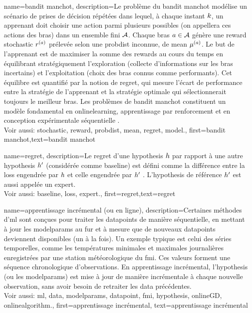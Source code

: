 {
	name={bandit manchot},
	description={Le problème du bandit manchot modélise un scénario 
		de prises de décision répétées dans lequel, à chaque instant $k$, un apprenant doit 
		choisir une action parmi plusieurs possibles (on appellera ces actions des bras) dans un ensemble fini $\mathcal{A}$. 
		Chaque bras $a \in \mathcal{A}$ génère une \gls{reward} \gls{stochastic} $r^{(a)}$ 
		prélevée selon une \gls{probdist} inconnue, de \gls{mean} $\mu^{(a)}$. 
		Le but de l’apprenant est de maximiser la somme des \glspl{reward} au cours du temps en équilibrant 
		stratégiquement l’exploration (collecte d’informations sur les bras incertains) et 
		l’exploitation (choix des bras connus comme performants). 
		Cet équilibre est quantifié par la notion de \gls{regret}, qui mesure l’écart de performance 
		entre la stratégie de l’apprenant et la stratégie optimale qui sélectionnerait toujours le meilleur bras. 
		Les problèmes de bandit manchot constituent un modèle fondamental en \gls{onlinelearning}, 
		apprentissage par renforcement et en conception expérimentale séquentielle \cite{Bubeck2012}.
		\\ 
		Voir aussi: \gls{stochastic}, \gls{reward}, \gls{probdist}, \gls{mean}, \gls{regret}, \gls{model}.},
	first={bandit manchot},text={bandit manchot}
}

{	name={regret},
	description={Le regret d’une \gls{hypothesis} $h$ par rapport à 
		une autre \gls{hypothesis} $h'$ (considérée comme \gls{baseline}) 
		est défini comme la différence entre la \gls{loss} engendrée par $h$ 
		et celle engendrée par $h'$ \cite{PredictionLearningGames}. 
		L'\gls{hypothesis} de référence $h'$ est aussi appelée un \gls{expert}.
		\\ 
		Voir aussi: \gls{baseline}, \gls{loss}, \gls{expert}.},
	first={regret},text={regret}
}

{
	name={apprentissage incrémental (ou en ligne)},
	description={Certaines méthodes d’\gls{ml}  sont conçues pour traiter les \glspl{datapoint} 
		de manière séquentielle, en mettant à jour les \gls{modelparams} au fur et à mesure que 
		de nouveaux \glspl{datapoint} deviennent disponibles (un à la fois). 
		Un exemple typique est celui des séries temporelles, comme les températures minimales et maximales
		journalières enregistrées par une station météorologique du \gls{fmi}. Ces valeurs forment 
		une séquence chronologique d’observations. En apprentissage incrémental, l’\gls{hypothesis} (ou les \gls{modelparams}) 
		est mise à jour de manière incrémentale à chaque nouvelle observation, sans avoir besoin de 
		retraiter les \gls{data} précédentes. \\
		Voir aussi: \gls{ml}, \gls{data}, \gls{modelparams}, \gls{datapoint}, \gls{fmi}, \gls{hypothesis}, \gls{onlineGD}, \gls{onlinealgorithm}.},
	first={apprentissage incrémental},
	text={apprentissage incrémental}
}


